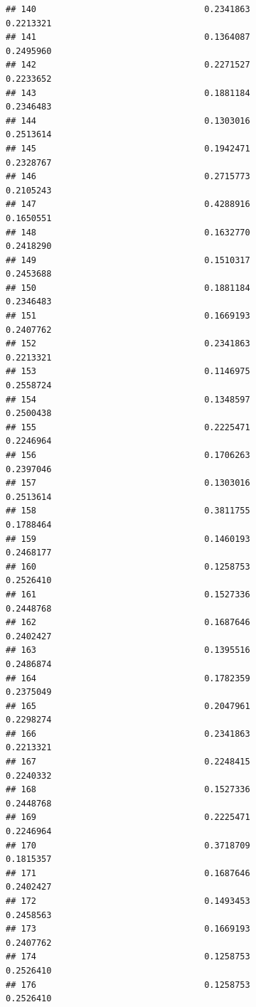 \documentclass[
  american,
  man,floatsintext]{apa7}
\begin{document}
\begin{verbatim}
## 140                                 0.2341863               0.2213321
## 141                                 0.1364087               0.2495960
## 142                                 0.2271527               0.2233652
## 143                                 0.1881184               0.2346483
## 144                                 0.1303016               0.2513614
## 145                                 0.1942471               0.2328767
## 146                                 0.2715773               0.2105243
## 147                                 0.4288916               0.1650551
## 148                                 0.1632770               0.2418290
## 149                                 0.1510317               0.2453688
## 150                                 0.1881184               0.2346483
## 151                                 0.1669193               0.2407762
## 152                                 0.2341863               0.2213321
## 153                                 0.1146975               0.2558724
## 154                                 0.1348597               0.2500438
## 155                                 0.2225471               0.2246964
## 156                                 0.1706263               0.2397046
## 157                                 0.1303016               0.2513614
## 158                                 0.3811755               0.1788464
## 159                                 0.1460193               0.2468177
## 160                                 0.1258753               0.2526410
## 161                                 0.1527336               0.2448768
## 162                                 0.1687646               0.2402427
## 163                                 0.1395516               0.2486874
## 164                                 0.1782359               0.2375049
## 165                                 0.2047961               0.2298274
## 166                                 0.2341863               0.2213321
## 167                                 0.2248415               0.2240332
## 168                                 0.1527336               0.2448768
## 169                                 0.2225471               0.2246964
## 170                                 0.3718709               0.1815357
## 171                                 0.1687646               0.2402427
## 172                                 0.1493453               0.2458563
## 173                                 0.1669193               0.2407762
## 174                                 0.1258753               0.2526410
## 176                                 0.1258753               0.2526410

\end{verbatim}
\end{document}
